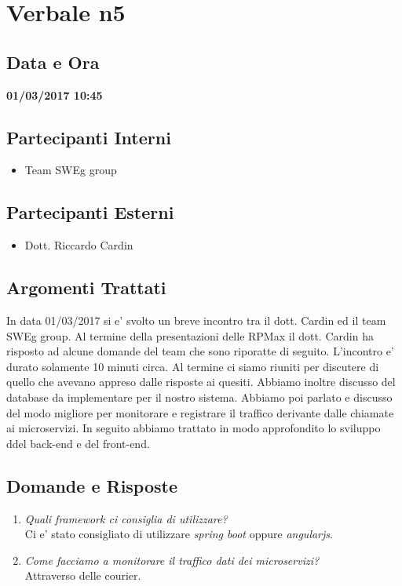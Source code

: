 \documentclass[12pt,a4paper,titlepage]{article}
\begin{document}
\section*{Verbale n5}
\subsection*{Data e Ora}
\begin{center}
\textbf{01/03/2017 10:45}
\end{center}
\subsection*{Partecipanti Interni}
\begin{itemize}
	\item Team SWEg group
\end{itemize}
\subsection*{Partecipanti Esterni}
\begin{itemize}
	\item Dott. Riccardo Cardin
\end{itemize}
\subsection*{Argomenti Trattati}
In data 01/03/2017 si e' svolto un breve incontro tra il dott. Cardin ed il team SWEg group. Al termine della presentazioni delle RPMax il dott. Cardin ha risposto ad alcune domande del team che sono riporatte di seguito. L'incontro e' durato solamente 10 minuti circa. Al termine ci siamo riuniti per discutere di quello che avevano appreso dalle risposte ai quesiti. Abbiamo inoltre discusso del database da implementare per il nostro sistema. Abbiamo poi parlato e discusso del modo migliore per monitorare e registrare il traffico derivante dalle chiamate ai microservizi. In seguito abbiamo trattato in modo approfondito lo sviluppo ddel back-end e del front-end.
\subsection*{Domande e Risposte}
\begin{enumerate}
	\item \textit{Quali framework ci consiglia di utilizzare?}\\
	\hspace{35pt}Ci e' stato consigliato di utilizzare \textit{spring boot} oppure \textit{angularjs}.
	\item \textit{Come facciamo a monitorare il traffico dati dei microservizi?}\\
	\hspace{35pt}Attraverso delle courier.
\end{enumerate}
\end{document}
